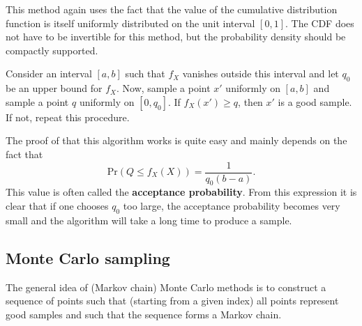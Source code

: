     This method again uses the fact that the value of the cumulative distribution function is itself uniformly distributed on the unit interval $[0,1]$. The CDF does not have to be invertible for this method, but the probability density should be compactly supported.

    \begin{method}
        Consider an interval $[a,b]$ such that $f_X$ vanishes outside this interval and let $q_0$ be an upper bound for $f_X$. Now, sample a point $x'$ uniformly on $[a,b]$ and sample a point $q$ uniformly on $[0,q_0]$. If $f_X(x')\geq q$, then $x'$ is a good sample. If not, repeat this procedure.
    \end{method}

    The proof of that this algorithm works is quite easy and mainly depends on the fact that \[\mathrm{Pr}(Q\leq f_X(X))=\frac{1}{q_0(b-a)}.\] This value is often called the \textbf{acceptance probability}. From this expression it is clear that if one chooses $q_0$ too large, the acceptance probability becomes very small and the algorithm will take a long time to produce a sample.

\subsection{Monte Carlo sampling}

    The general idea of (Markov chain) Monte Carlo methods is to construct a sequence of points such that (starting from a given index) all points represent good samples and such that the sequence forms a Markov chain.

